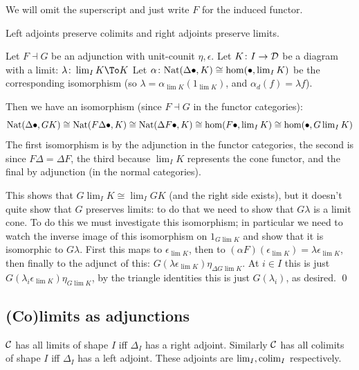 We will omit the superscript and just write $F$ for the induced functor.

\bthrm

    Left adjoints preserve colimits and right adjoints preserve limits.

\ethrm

\bproof

    Let $F\dashv G$ be an adjunction with unit-counit $\eta,\epsilon$.
    Let $K\colon I\to{{\cal D}}$ be a diagram with a limit: $\lambda\colon\lim_IK\To K$
    Let $\alpha\colon{\rm Nat}(\Delta\bullet,K)\cong\hom(\bullet,\mathop{\rm lim}\nolimits_IK)$ be the corresponding isomorphism (so $\lambda=\alpha_{\lim K}(1_{\lim K})$, and $\alpha_d(f)=\lambda f$).

    Then we have an isomorphism (since $F\dashv G$ in the functor categories):
    $$ {\rm Nat}(\Delta\bullet,GK) \cong {\rm Nat}(F\Delta\bullet,K) \cong {\rm Nat}(\Delta F\bullet,K) \cong \hom(F\bullet,\mathop{\rm lim}\nolimits_IK) \cong \hom(\bullet,G\mathop{\rm lim}\nolimits_IK) $$
    The first isomorphism is by the adjunction in the functor categories, the second is since $F\Delta=\Delta F$, the third because $\lim_IK$ represents the cone
    functor, and the final by adjunction (in the normal categories).

    This shows that $G\lim_IK\cong\lim_IGK$ (and the right side exists), but it doesn't quite show that $G$ preserves limits: to do that we need to show that $G\lambda$
    is a limit cone.
    To do this we must investigate this isomorphism; in particular we need to watch the inverse image of this isomorphism on $1_{G\lim K}$ and show that it is isomorphic to $G\lambda$.
    First this maps to $\epsilon_{\lim K}$, then to $(\alpha F)(\epsilon_{\lim K})=\lambda\epsilon_{\lim K}$, then finally to the adjunct of this: $G(\lambda\epsilon_{\lim K})\eta_{\Delta G\lim K}$.
    At $i\in I$ this is just $G(\lambda_i\epsilon_{\lim K})\eta_{G\lim K}$, by the triangle identities this is just $G(\lambda_i)$, as desired.
    \qed

\eproof

\subsection{(Co)limits as adjunctions}

\bthrm

    ${{\cal C}}$ has all limits of shape $I$ iff $\Delta_I$ has a right adjoint.
    Similarly ${{\cal C}}$ has all colimits of shape $I$ iff $\Delta_I$ has a left adjoint.
    These adjoints are $\mathop{\rm lim}\nolimits_I,\mathop{\rm colim}\nolimits_I$ respectively.

\ethrm

